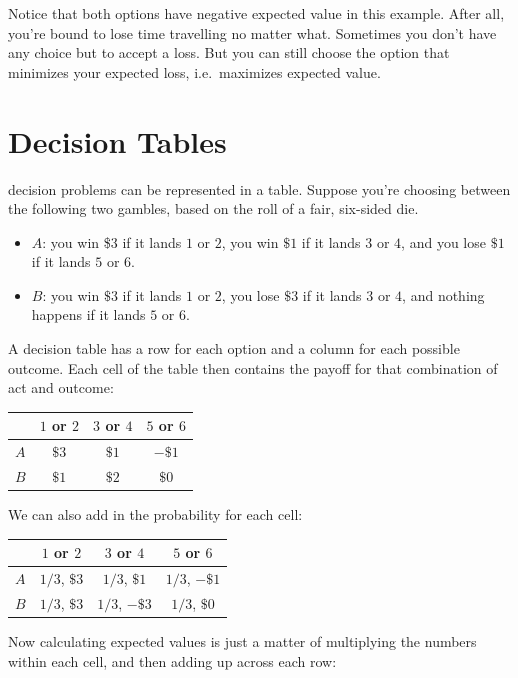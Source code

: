 \documentclass[justified]{tufte-book}
\providecommand{\tightlist}{%
  \setlength{\itemsep}{0pt}\setlength{\parskip}{0pt}}
\theoremstyle{definition}
\theoremstyle{definition}
\theoremstyle{definition}
\theoremstyle{remark}
\begin{document}
Notice that both options have negative expected value in this example. After all, you're bound to lose time travelling no matter what. Sometimes you don't have any choice but to accept a loss. But you can still choose the option that minimizes your expected loss, i.e.~maximizes expected value.

\hypertarget{decision-tables}{%
\section{Decision Tables}\label{decision-tables}}

 decision problems can be represented in a table. Suppose you're choosing between the following two gambles, based on the roll of a fair, six-sided die.

\begin{itemize}
\tightlist
\item
  \(A\): you win \$3 if it lands \(1\) or \(2\), you win \(\$1\) if it lands \(3\) or \(4\), and you lose \(\$1\) if it lands \(5\) or \(6\).
\item
  \(B\): you win \(\$3\) if it lands \(1\) or \(2\), you lose \(\$3\) if it lands \(3\) or \(4\), and nothing happens if it lands \(5\) or \(6\).
\end{itemize}

A decision table has a row for each option and a column for each possible outcome. Each cell of the table then contains the payoff for that combination of act and outcome:

\begin{longtable}[]{@{}lccc@{}}
\toprule
& \(1\) or \(2\) & \(3\) or \(4\) & \(5\) or \(6\)\tabularnewline
\midrule
\endhead
\(A\) & \(\$3\) & \(\$1\) & \(-\$1\)\tabularnewline
\(B\) & \(\$1\) & \(\$2\) & \(\$0\)\tabularnewline
\bottomrule
\end{longtable}

We can also add in the probability for each cell:

\begin{longtable}[]{@{}lccc@{}}
\toprule
& \(1\) or \(2\) & \(3\) or \(4\) & \(5\) or \(6\)\tabularnewline
\midrule
\endhead
\(A\) & \(1/3\), \(\$3\) & \(1/3\), \(\$1\) & \(1/3\), \(-\$1\)\tabularnewline
\(B\) & \(1/3\), \(\$3\) & \(1/3\), \(-\$3\) & \(1/3\), \(\$0\)\tabularnewline
\bottomrule
\end{longtable}

Now calculating expected values is just a matter of multiplying the numbers within each cell, and then adding up across each row:
\end{document}
